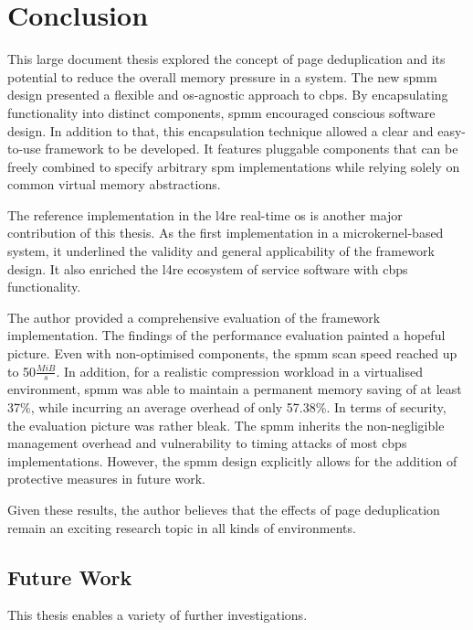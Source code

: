 \chapter{Conclusion}
\label{chap:conclusion}

This large document thesis explored the concept of page deduplication and its potential to reduce the overall memory pressure in a system.
The new \ac{spmm} design presented a flexible and \ac{os}-agnostic approach to \acl{cbps}.
By encapsulating functionality into distinct components, \ac{spmm} encouraged conscious software design.
In addition to that, this encapsulation technique allowed a clear and easy-to-use framework to be developed.
It features pluggable components that can be freely combined to specify arbitrary \ac{spm} implementations while relying solely on common virtual memory abstractions.

The reference implementation in the \ac{l4re} real-time \ac{os} is another major contribution of this thesis.
As the first implementation in a microkernel-based system, it underlined the validity and general applicability of the framework design.
It also enriched the \ac{l4re} ecosystem of service software with \ac{cbps} functionality.

The author provided a comprehensive evaluation of the framework implementation.
The findings of the performance evaluation painted a hopeful picture.
Even with non-optimised components, the \ac{spmm} scan speed reached up to 50$\frac{MiB}{s}$.
In addition, for a realistic compression workload in a virtualised environment, \ac{spmm} was able to maintain a permanent memory saving of at least 37\%, while incurring an average overhead of only 57.38\%.
In terms of security, the evaluation picture was rather bleak.
The \ac{spmm} inherits the non-negligible management overhead and vulnerability to timing attacks of most \ac{cbps} implementations.
However, the \ac{spmm} design explicitly allows for the addition of protective measures in future work.

Given these results, the author believes that the effects of page deduplication remain an exciting research topic in all kinds of environments.

\section{Future Work}
\label{sec:future-work}

This thesis enables a variety of further investigations.

